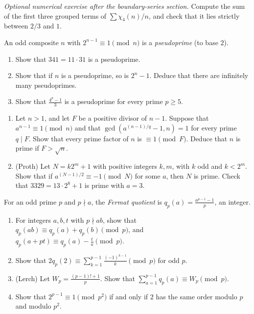 \begin{exercise}[$\star$]\label{ex:t1-group3}
\emph{Optional numerical exercise after the boundary-series section.}
Compute the sum of the first three grouped terms of $\sum\chi_4(n)/n$, and check that it lies strictly between $2/3$ and $1$.
\end{exercise}

\begin{exercise}[$\star\star$]\label{pb:pseudo}
An odd composite $n$ with $2^{n-1}\equiv1\pmod n$ is a \emph{pseudoprime} (to base $2$).
\begin{enumerate}[label=(\alph*)]
\item Show that $341=11\cdot31$ is a pseudoprime.
\item Show that if $n$ is a pseudoprime, so is $2^n-1$. Deduce that there are infinitely many pseudoprimes.
\item Show that $\frac{4^p-1}3$ is a pseudoprime for every prime $p\ge5$.
\end{enumerate}
\end{exercise}

\begin{exercise}[$\star\star$]\label{pb:pocklington}
\begin{enumerate}[label=(\alph*)]
\item Let $n>1$, and let $F$ be a positive divisor of $n-1$. Suppose that $a^{n-1}\equiv1\pmod n$ and that $\gcd(a^{(n-1)/q}-1,n)=1$ for every prime
$q\mid F$. Show that every prime factor of $n$ is $\equiv1\pmod F$. Deduce that $n$ is prime if $F>\sqrt n$.
\item (Proth) Let $N=k2^m+1$ with positive integers $k,m$, with $k$ odd and $k<2^m$. Show that if $a^{(N-1)/2}\equiv-1\pmod N$ for some $a$, then $N$ is
prime. Check that $3329=13\cdot2^8+1$ is prime with $a=3$.
\end{enumerate}
\end{exercise}

\begin{exercise}[$\star\star$]\label{pb:fermatquot}
For an odd prime $p$ and $p\nmid a$, the \emph{Fermat quotient} is $q_p(a)=\frac{a^{p-1}-1}p$, an integer.
\begin{enumerate}[label=(\alph*)]
\item For integers $a,b,t$ with $p\nmid ab$, show that $q_p(ab)\equiv q_p(a)+q_p(b)\pmod p$, and $q_p(a+pt)\equiv q_p(a)-\frac ta\pmod p$.
\item Show that $2q_p(2)\equiv\sum_{k=1}^{p-1}\frac{(-1)^{k-1}}k\pmod p$ for odd $p$.
\item (Lerch) Let $W_p=\frac{(p-1)!+1}p$. Show that $\sum_{a=1}^{p-1}q_p(a)\equiv W_p\pmod p$.
\item Show that $2^{p-1}\equiv1\pmod{p^2}$ if and only if $2$ has the same order modulo $p$ and modulo $p^2$.
\end{enumerate}
\end{exercise}

